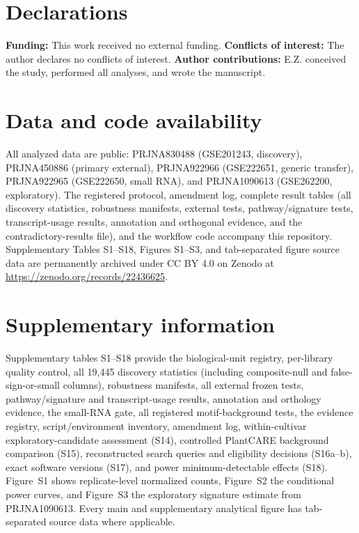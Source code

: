 \documentclass[11pt]{article}
\begin{document}
\section*{Declarations}

\textbf{Funding:} This work received no external funding. \textbf{Conflicts of interest:} The author declares no conflicts of interest. \textbf{Author contributions:} E.Z. conceived the study, performed all analyses, and wrote the manuscript.

\section*{Data and code availability}

All analyzed data are public: PRJNA830488 (GSE201243, discovery), PRJNA450886 (primary external), PRJNA922966 (GSE222651, generic transfer), PRJNA922965 (GSE222650, small RNA), and PRJNA1090613 (GSE262200, exploratory). The registered protocol, amendment log, complete result tables (all discovery statistics, robustness manifests, external tests, pathway/signature tests, transcript-usage results, annotation and orthogonal evidence, and the contradictory-results file), and the workflow code accompany this repository. Supplementary Tables S1--S18, Figures S1--S3, and tab-separated figure source data are permanently archived under CC BY 4.0 on Zenodo at \url{https://zenodo.org/records/22436625}.

\section*{Supplementary information}

Supplementary tables S1--S18 provide the biological-unit registry, per-library quality control, all 19,445 discovery statistics (including composite-null and false-sign-or-small columns), robustness manifests, all external frozen tests, pathway/signature and transcript-usage results, annotation and orthology evidence, the small-RNA gate, all registered motif-background tests, the evidence registry, script/environment inventory, amendment log, within-cultivar exploratory-candidate assessment (S14), controlled PlantCARE background comparison (S15), reconstructed search queries and eligibility decisions (S16a--b), exact software versions (S17), and power minimum-detectable effects (S18). Figure~S1 shows replicate-level normalized counts, Figure~S2 the conditional power curves, and Figure~S3 the exploratory signature estimate from PRJNA1090613. Every main and supplementary analytical figure has tab-separated source data where applicable.
\end{document}
